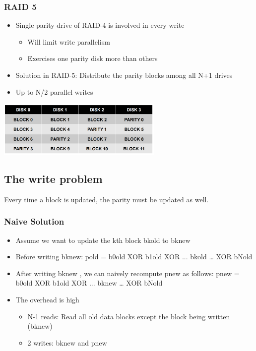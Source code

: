 \documentclass[12pt]{article}
\begin{document}
\subsubsection{RAID 5}
\begin{itemize}
    \item Single parity drive of RAID-4 is involved in every write \begin{itemize}
        \item Will limit write parallelism 
        \item Exercises one parity disk more than others
    \end{itemize} 
    \item Solution in RAID-5: Distribute the parity blocks among all N+1 drives 
    \item Up to N/2 parallel writes
\end{itemize}
\includegraphics[width=0.6\textwidth]{Raid5.png}
\subsection{The write problem}
Every time a block is updated, the parity must be updated as well.
\subsubsection{Naive Solution}
\begin{itemize}
    \item Assume we want to update the kth block bkold to bknew 
    \item Before writing bknew: pold = b0old XOR b1old XOR ... bkold … XOR bNold
    \item After writing bknew , we can naively recompute pnew as follows: pnew = b0old XOR b1old XOR ... bknew … XOR bNold
    \item The overhead is high \begin{itemize}
        \item N-1 reads: Read all old data blocks except the block being written (bknew)
        \item 2 writes: bknew and pnew
    \end{itemize}
\end{itemize}
\end{document}
